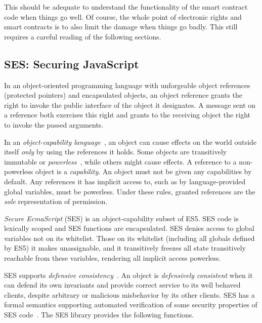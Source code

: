 \documentclass{llncs}
\begin{document}
This should be adequate to understand the functionality of the smart contract code when things go well. Of course, the whole point of electronic rights and smart contracts is to also limit the damage when things go badly. This still requires a careful reading of the following sections.
 

\subsection{SES: Securing JavaScript}
\label{ses}

In an object-oriented programming language with unforgeable object references (protected pointers) and encapsulated objects, an object reference grants the right to invoke the public interface of the object it designates. A message sent on a reference both exercises this right and grants to the receiving object the right to invoke the passed arguments. 

In an \emph{object-capability language}~\cite{RobustComposition}, an object can cause effects on the world outside itself \emph{only} by using the references it holds. Some objects are transitively immutable or \emph{powerless}~\cite{Mettler:EECS-2012-244}, while others might cause effects. A reference to a non-powerless object is a \emph{capability}. An object must not be given any capabilities by default. Any references it has implicit access to, such as by language-provided global variables, must be powerless. Under these rules, granted references are the \emph{sole} representation of permission.

\emph{Secure EcmaScript} (SES) is an object-capability subset of ES5. SES code is lexically scoped and SES functions are encapsulated. SES denies access to global variables not on its whitelist. Those on its whitelist (including all globals defined by ES5) it makes unassignable, and it transitively freezes all state transitively reachable from these variables, rendering all implicit access powerless. 

SES supports \emph{defensive consistency}~\cite{RobustComposition}. An object is \emph{defensively consistent} when it can defend its own invariants and provide correct service to its well behaved clients, despite arbitrary or malicious misbehavior by its other clients. SES has a formal semantics supporting automated verification of some security properties of SES code~\cite{taly2011automated}. The SES library provides the following functions.
\end{document}
